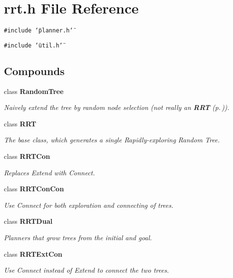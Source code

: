 \section{rrt.h File Reference}
\label{rrt_h}
{\tt \#include \char`\"{}planner.h\char`\"{}}\par
{\tt \#include \char`\"{}util.h\char`\"{}}\par
\subsection*{Compounds}
\begin{CompactItemize}
\item 
class {\bf Random\-Tree}
\begin{CompactList}\small\item\em Naively extend the tree by random node selection (not really an {\bf RRT} {\rm (p.\,\pageref{class_RRT})}).\item\end{CompactList}\item 
class {\bf RRT}
\begin{CompactList}\small\item\em The base class, which generates a single Rapidly-exploring Random Tree.\item\end{CompactList}\item 
class {\bf RRTCon}
\begin{CompactList}\small\item\em Replaces Extend with Connect.\item\end{CompactList}\item 
class {\bf RRTCon\-Con}
\begin{CompactList}\small\item\em Use Connect for both exploration and connecting of trees.\item\end{CompactList}\item 
class {\bf RRTDual}
\begin{CompactList}\small\item\em Planners that grow trees from the initial and goal.\item\end{CompactList}\item 
class {\bf RRTExt\-Con}
\begin{CompactList}\small\item\em Use Connect instead of Extend to connect the two trees.\item\end{CompactList}\item 

\end{CompactItemize}
